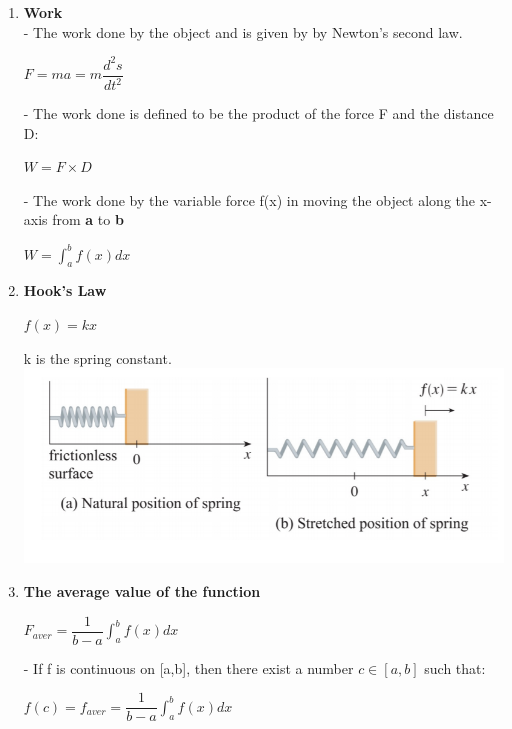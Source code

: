 \documentclass[10pt]{article}
\begin{document}
\begin{enumerate}
	 \item \textbf{Work}\\
	 - The work done by the object and is given by by Newton's second law.
	 \begin{mybox}
	 \begin{center}
	 $F = ma = m \dfrac{d^2s}{dt^2}$
	 \end{center}
	 \end{mybox}
	 - The work done is defined to be the product of the force F and the distance D:
	 \begin{mybox}
	 \begin{center}
	 $W = F \times D$
	 \end{center}
	 \end{mybox}
	 - The work done by the variable force f(x) in moving the object along the x-axis from \textbf{a} to \textbf{b}
	 \begin{mybox}
	 \begin{center}
	 $W = \displaystyle \int_{a}^{b} f(x)dx$
	 \end{center}
	 \end{mybox}
	 \item \textbf{Hook's Law}\\
	 \begin{mybox}
	 \begin{center}
	 $f(x)=kx$
	 \end{center}
	 \end{mybox}
	 k is the spring constant.\\
	 \includegraphics{hinh1}
	 \item \textbf{The average value of the function}
	 \begin{mybox}
	 \begin{center}
	 $F_{aver} = \dfrac{1}{b-a} \displaystyle
	 \int_{a}^{b} f(x)dx$
	 \end{center}
	 \end{mybox}
	 - If f is continuous on [a,b], then there exist a number $c \in [a,b]$ such that:
	 \begin{mybox}
	 \begin{center}
	 $f(c) = f_{aver} = \dfrac{1}{b-a} \displaystyle \int_{a}^{b} f(x)dx$
	 \end{center}
	 \end{mybox}
\end{enumerate}
\end{document}
